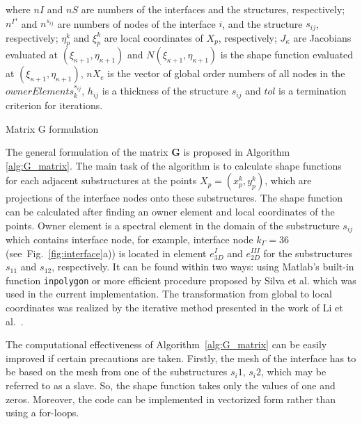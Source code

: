 \documentclass[materials,article,submit,moreauthors,pdftex]{Definitions/mdpi}
\begin{document}
\begin{algorithm}[H]
{{		}
	}
where \(nI\) and \(nS\) are numbers of the interfaces and the structures, respectively; \(n^{\Gamma^i}\) and \(n^{s_{ij}}\) are numbers of nodes of the interface \(i\), and the structure \(s_{ij}\), respectively; \(\eta^k_p\) and  \(\xi^k_p\) are local coordinates of \(X_p\), respectively; \(J_{\kappa}\) are Jacobians evaluated at \((\xi_{\kappa+1},\eta_{\kappa+1})\) and \(N(\xi_{\kappa+1},\eta_{\kappa+1})\) is the shape function evaluated at \((\xi_{\kappa+1},\eta_{\kappa+1})\), \(nX_e\) is the vector of global order numbers of all nodes in the \(ownerElements^{s_{ij}}_k\), \(h_{ij}\) is a thickness of the structure \(s_{ij}\) and \(tol\) is a termination criterion for iterations.
	\caption{Matrix G formulation}
	\label{alg:G_matrix}
\end{algorithm}
The general formulation of the matrix \textbf{G} is proposed in Algorithm \ref{alg:G_matrix}.
The main task of the algorithm is to calculate shape functions for each adjacent substructures at the points \(X_p=(x_p^k,y_p^k)\), which are projections of the interface nodes onto these substructures.
The shape function can be calculated after finding an owner element and local coordinates of the points.
Owner element is a spectral element in the domain of the substructure \(s_{ij}\) which contains interface node, for example, interface node \(k_\Gamma=36\) (see~Fig.~\ref{fig:interface}a)) is located in element \(e^{I}_{3D}\) and \(e^{III}_{2D}\) for the substructures \(s_{11}\) and \(s_{12}\), respectively.
It can be found within two ways: using Matlab's built-in function \verb+inpolygon+ or more efficient procedure proposed by Silva et al. \cite{silva2009exact} which was used in the current implementation.
The transformation from global to local coordinates was realized by the iterative method presented in the work of Li et al.~\cite{li2014efficient}.

The computational effectiveness of Algorithm~\ref{alg:G_matrix} can be easily improved if certain precautions are taken.
Firstly, the mesh of the interface has to be based on the mesh from one of the substructures \(s_i1\), \(s_i2\), which may be referred to as a slave.
So, the shape function takes only the values of one and zeros.
Moreover, the code can be implemented in vectorized form rather than using a for-loops.
\end{document}
